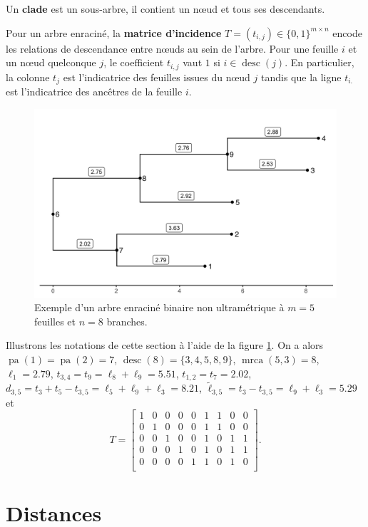 \documentclass[12pt,a4paper]{reedthesis}
\DeclareMathOperator*{\pa}{pa}
\DeclareMathOperator*{\mrca}{mrca}
\DeclareMathOperator*{\desc}{desc}
\theoremstyle{definition}
\theoremstyle{definition}
\theoremstyle{definition}
\theoremstyle{remark}
\begin{document}
Un \textbf{clade} est un sous-arbre, il contient un nœud et tous ses descendants.

Pour un arbre enraciné, la \textbf{matrice d'incidence} \(T = (t_{i,j}) \in\{0,1\}^{m \times n}\) encode les relations de descendance entre nœuds au sein de l'arbre. Pour une feuille \(i\) et un nœud quelconque \(j\), le coefficient \(t_{i,j}\) vaut \(1\) si \(i \in \desc(j)\). En particulier, la colonne \(t_j\) est l'indicatrice des feuilles issues du nœud \(j\) tandis que la ligne \(t_{i.}\) est l'indicatrice des ancêtres de la feuille \(i\).


\begin{figure}

{\centering \includegraphics[width=0.9\linewidth]{img/tree_raw} 

}

\caption{Exemple d'un arbre enraciné binaire non ultramétrique à \(m = 5\) feuilles et \(n = 8\) branches.}\label{fig:treeraw}
\end{figure}
Illustrons les notations de cette section à l'aide de la figure \ref{fig:treeraw}. On a alors \(\pa(1) = \pa(2) = 7\), \(\desc(8) = \{3, 4, 5, 8, 9\}\), \(\mrca(5, 3) = 8\), \(\ell_1 = 2.79\), \(t_{3,4} = t_9 = \ell_8 + \ell_9 = 5.51\), \(t_{1,2} = t_7 = 2.02\), \(d_{3,5} = t_3 + t_5 - t_{3,5} = \ell_5 + \ell_9 + \ell_3 = 8.21\), \(\tilde{\ell}_{3,5} = t_3 - t_{3,5} = \ell_9 + \ell_3 = 5.29\) et
\begin{equation*}
T = 
\begin{bmatrix}
1 & 0 & 0 & 0 & 0 & 1 & 1 & 0 & 0 \\
0 & 1 & 0 & 0 & 0 & 1 & 1 & 0 & 0 \\
0 & 0 & 1 & 0 & 0 & 1 & 0 & 1 & 1 \\
0 & 0 & 0 & 1 & 0 & 1 & 0 & 1 & 1 \\
0 & 0 & 0 & 0 & 1 & 1 & 0 & 1 & 0 \\
\end{bmatrix}.
\end{equation*}
\hypertarget{distances}{%
\section{Distances}\label{distances}}
\end{document}
